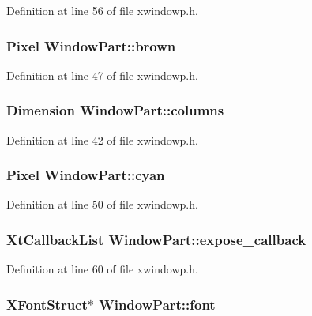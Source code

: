 Definition at line 56 of file xwindowp.\+h.

\hypertarget{structWindowPart_a97c07c322b095a2fb4e6d857bd1134d4}{
\subsubsection[{brown}]{\setlength{\rightskip}{0pt plus 5cm}Pixel Window\+Part\+::brown}}\label{structWindowPart_a97c07c322b095a2fb4e6d857bd1134d4}


Definition at line 47 of file xwindowp.\+h.

\hypertarget{structWindowPart_a84cba698ad83d05300c32768817f0afc}{
\subsubsection[{columns}]{\setlength{\rightskip}{0pt plus 5cm}Dimension Window\+Part\+::columns}}\label{structWindowPart_a84cba698ad83d05300c32768817f0afc}


Definition at line 42 of file xwindowp.\+h.

\hypertarget{structWindowPart_a19b4039208c46af3a7a9a8460bd8236f}{
\subsubsection[{cyan}]{\setlength{\rightskip}{0pt plus 5cm}Pixel Window\+Part\+::cyan}}\label{structWindowPart_a19b4039208c46af3a7a9a8460bd8236f}


Definition at line 50 of file xwindowp.\+h.

\hypertarget{structWindowPart_afa6864c4003c472a85b2895bf96d9455}{
\subsubsection[{expose\+\_\+callback}]{\setlength{\rightskip}{0pt plus 5cm}Xt\+Callback\+List Window\+Part\+::expose\+\_\+callback}}\label{structWindowPart_afa6864c4003c472a85b2895bf96d9455}


Definition at line 60 of file xwindowp.\+h.

\hypertarget{structWindowPart_ac697050ca10e4b0ab08f5440e35eebd4}{
\subsubsection[{font}]{\setlength{\rightskip}{0pt plus 5cm}X\+Font\+Struct$\ast$ Window\+Part\+::font}}\label{structWindowPart_ac697050ca10e4b0ab08f5440e35eebd4}


